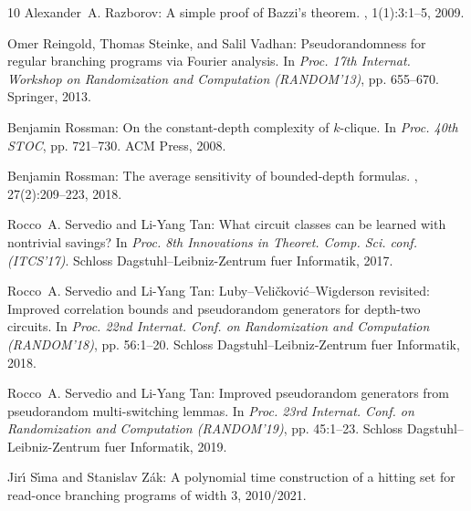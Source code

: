 \documentclass[11pt]{article}
\numberwithin{equation}{section}
\theoremstyle{definition}
\theoremstyle{plain}
\theoremstyle{plain}
\begin{document}
\begin{thebibliography}{10}
{\sc Alexander~A. Razborov}: A simple proof of {Bazzi's} theorem.
, 1(1):3:1--5, 2009.
\newblock [\epfmtdoi{10.1145/1490270.1490273}]

{\sc Omer Reingold, Thomas Steinke, and Salil Vadhan}: Pseudorandomness for
  regular branching programs via {F}ourier analysis.
\newblock In {\em Proc. 17th Internat. Workshop on Randomization and
  Computation (RANDOM'13)}, pp. 655--670. Springer, 2013.
\newblock [\epfmtdoi{10.1007/978-3-642-40328-6\_45}]

{\sc Benjamin Rossman}: On the constant-depth complexity of $k$-clique.
\newblock In {\em Proc. 40th STOC}, pp. 721--730. ACM Press, 2008.
\newblock [\epfmtdoi{10.1145/1374376.1374480}]

{\sc Benjamin Rossman}: The average sensitivity of bounded-depth formulas.
, 27(2):209--223, 2018.
\newblock [\epfmtdoi{10.1007/s00037-017-0156-0}]

{\sc Rocco~A. Servedio and Li-Yang Tan}: What circuit classes can be learned
  with nontrivial savings?
\newblock In {\em Proc. 8th Innovations in Theoret. Comp. Sci. conf.
  (ITCS'17)}. Schloss Dagstuhl--Leibniz-Zentrum fuer Informatik, 2017.

{\sc Rocco~A. Servedio and Li-Yang Tan}: {Luby--Veli{\v{c}}kovi{\'c}--Wigderson
  revisited: {I}mproved correlation bounds and pseudorandom generators for
  depth-two circuits}.
\newblock In {\em Proc. 22nd Internat. Conf. on Randomization and Computation
  (RANDOM'18)}, pp. 56:1--20. Schloss Dagstuhl--Leibniz-Zentrum fuer
  Informatik, 2018.

{\sc Rocco~A. Servedio and Li-Yang Tan}: Improved pseudorandom generators from
  pseudorandom multi-switching lemmas.
\newblock In {\em Proc. 23rd Internat. Conf. on Randomization and Computation
  (RANDOM'19)}, pp. 45:1--23. Schloss Dagstuhl--Leibniz-Zentrum fuer
  Informatik, 2019.

{\sc Jir{\'{\i}} S{\'{\i}}ma and Stanislav Z{\'{a}}k}: A polynomial time
  construction of a hitting set for read-once branching programs of width 3,
  2010/2021.


\end{thebibliography}
\end{document}
